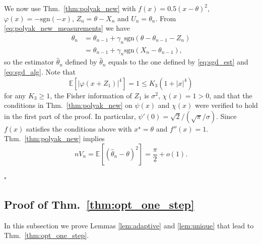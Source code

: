 \documentclass[letterpaper, conference,9pt]{IEEEtran}      %
\newcommand{\sgn}{\mathrm{sgn} }
\newcommand*{\QEDA}{\hfill\ensuremath{\square}}
\begin{document}
We now use Thm.~\ref{thm:polyak_new} with $f(x) = 0.5(x-\theta)^2$, $\varphi(x) = -\sgn(-x)$, $Z_n = \theta-X_n$ and $U_n = \theta_n$. From \eqref{eq:polyak_new_measurements} we have
\begin{align*} 
\theta_n & = \theta_{n-1} + \gamma_n \sgn(\theta-\theta_{n-1} - Z_n )  \\
& = \theta_{n-1} + \gamma_n \sgn(X_n-\theta_{n-1} ),
\end{align*}
so the estimator $\widehat{\theta}_n$ defined by $\widehat{\theta}_n$ equals to the one defined by \eqref{eq:sgd_est} and \eqref{eq:sgd_alg}. Note that
\[
\mathbb E \left[ | \varphi(x+Z_1) |^4 \right] = 1 \leq K_3(1+|x|^4)
\]
for any $K_3\geq 1$, the Fisher information of $Z_1$ is $\sigma^2$, $\chi(x) = 1 > 0$, and that 
the conditions in Thm.~\ref{thm:polyak_new} on $\psi(x)$ and $\chi(x)$ were verified to hold in the first part of the proof. In particular, $\psi'(0) = \sqrt{2}/ (\sqrt{\pi}/\sigma)$. Since $f(x)$ satisfies the conditions above with $x^\star = \theta$ and $f''(x) = 1$. Thm.~\ref{thm:polyak_new} implies 
\[
n V_n = \mathbb E \left[ \left(\widehat{\theta}_n-\theta \right)^2 \right]  = \frac{\pi}{2}  + o(1).
\]

 \QEDA


\subsection*{Proof of Thm.~\ref{thm:opt_one_step}}
In this subsection we prove Lemmas \ref{lem:adaptive} and \ref{lem:unique} that lead to Thm.~\ref{thm:opt_one_step}. 
\end{document}
